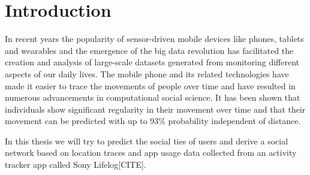 \section{Introduction}
In recent years the popularity of sensor-driven mobile devices like phones, tablets and wearables and the emergence of the big data revolution has facilitated the creation and analysis of large-scale datasets generated from monitoring different aspects of our daily lives\cite{lazer2009life}. The mobile phone and its related technologies have made it easier to trace the movements of people over time and have resulted in numerous advancements in computational social science. It has been shown that individuals show significant regularity in their movement over time\cite{Uihmp} and that their movement can be predicted with up to 93\% probability independent of distance\cite{LoPiHM}.

In this thesis we will try to predict the social ties of users and derive a social network based on location traces and app usage data collected from an activity tracker app called Sony Lifelog[CITE].

